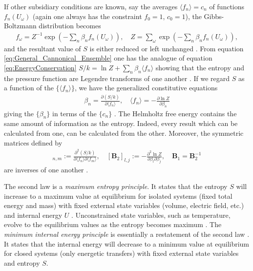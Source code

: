 \documentclass[english,12pt]{ttuthes}
\begin{document}
If other subsidiary conditions are known, say the averages
$\langle f_n\rangle=c_n$ of functions $f_n(U_\omega)$ (again one always has the
constraint $f_0=1$, $c_0=1$), the Gibbs-Boltzmann distribution becomes
\cite{Robertson-1993,Balian:NCB:471} 
%
\begin{align}	\label{eq:General_Cannonical_Ensemble}
f_\omega=Z^{-1}\exp\left(-\sum_n\beta_n f_n(U_\omega)\right),\quad
Z=\sum_\omega\exp\left(-\sum_n\beta_n f_n(U_\omega)\right),
\end{align}
%
and the resultant value of $S$ is either reduced or left unchanged
\cite{Robertson-1993}. From equation
\eqref{eq:General_Cannonical_Ensemble} one has the analogue of
equation \eqref{eq:EnergyConservation} $S/k=\ln{Z}+\sum_n\beta_n\langle f_n\rangle$ showing
that the entropy and the pressure function are Legendre transforms of
one another \cite{Robertson-1993}. If we regard $S$ as a function of
the $\{\langle f_n\rangle\}$, we have the generalized constitutive equations
%
\begin{align}\label{eq:Gen_Constitutive_eqs}
  \beta_n=\frac{\partial(S/k)}{\partial\langle f_n\rangle}, \quad \langle f_n\rangle=-\frac{\partial\ln{Z}}{\partial\beta_n}
\end{align}
%
giving the $\{\beta_n\}$ in terms of the $\{c_n\}$
\cite{Robertson-1993}. The Helmholtz free energy contains the same
amount of information as the entropy. Indeed, every result which can
be calculated from one, can be calculated from the other. Moreover,
the symmetric matrices defined by
%
\begin{align}
  [\mathbf{B}_1]_{n,m}:=\frac{\partial^2(S/k)}{\partial\langle f_n\rangle\partial\langle f_m\rangle}, \quad
  [\mathbf{B}_2]_{l,j}:=-\frac{\partial^2\ln{Z}}{\partial\beta_l\partial\beta_j}, \quad
  \mathbf{B}_1=\mathbf{B}_2^{-1}
\end{align}
are inverses of one another \cite{Robertson-1993}. 

The second law is a \emph{maximum entropy principle}. It states
that the entropy $S$ will increase to a maximum value at equilibrium for
isolated systems (fixed total energy and mass) with fixed external
state variables (volume, electric field, etc.) and internal energy
$U$ \cite{Bobbio-2000,Robertson-1993,Thompson-1988}. Unconstrained
state variables, such as temperature, evolve to the equilibrium values
as the entropy becomes maximum \cite{Callen-1985}. The \emph{minimum
  internal energy principle}  is essentially a restatement of the
second law \cite{Callen-1985}. It states that the internal energy will
decrease to a minimum value at equilibrium for closed systems (only
energetic transfers) with fixed external state variables and entropy $S$.
\end{document}
